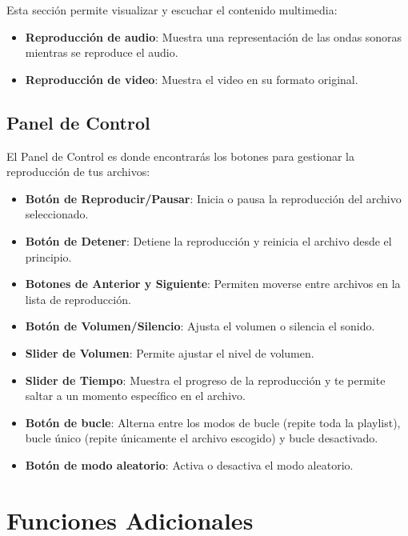\documentclass[a4paper,12pt]{article}
\begin{document}
Esta sección permite visualizar y escuchar el contenido multimedia:

\begin{itemize}
    \item \textbf{Reproducción de audio}: Muestra una representación de las ondas sonoras mientras se reproduce el audio.
    \item \textbf{Reproducción de video}: Muestra el video en su formato original.
\end{itemize}

\subsection*{Panel de Control}

El Panel de Control es donde encontrarás los botones para gestionar la reproducción de tus archivos:

\begin{itemize}
    \item \textbf{Botón de Reproducir/Pausar}: Inicia o pausa la reproducción del archivo seleccionado.
    \item \textbf{Botón de Detener}: Detiene la reproducción y reinicia el archivo desde el principio.
    \item \textbf{Botones de Anterior y Siguiente}: Permiten moverse entre archivos en la lista de reproducción.
    \item \textbf{Botón de Volumen/Silencio}: Ajusta el volumen o silencia el sonido.
    \item \textbf{Slider de Volumen}: Permite ajustar el nivel de volumen.
    \item \textbf{Slider de Tiempo}: Muestra el progreso de la reproducción y te permite saltar a un momento específico en el archivo.
    \item \textbf{Botón de bucle}: Alterna entre los modos de bucle (repite toda la playlist), bucle único (repite únicamente el archivo escogido) y bucle desactivado.
    \item \textbf{Botón de modo aleatorio}: Activa o desactiva el modo aleatorio.
\end{itemize}

\section*{Funciones Adicionales}
\end{document}
